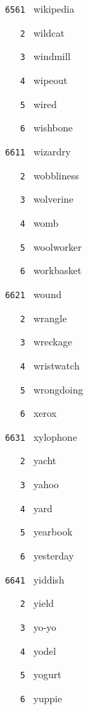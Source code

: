\documentclass[11pt]{article}
\begin{document}
\begin{multicols}{6}
\noindent \texttt{ 6561 } wikipedia  \par
\noindent \texttt{ \ \ \ 2 } wildcat  \par
\noindent \texttt{ \ \ \ 3 } windmill  \par
\noindent \texttt{ \ \ \ 4 } wipeout  \par
\noindent \texttt{ \ \ \ 5 } wired  \par
\noindent \texttt{ \ \ \ 6 } wishbone  \par
\noindent \texttt{ 6611 } wizardry  \par
\noindent \texttt{ \ \ \ 2 } wobbliness  \par
\noindent \texttt{ \ \ \ 3 } wolverine  \par
\noindent \texttt{ \ \ \ 4 } womb  \par
\noindent \texttt{ \ \ \ 5 } woolworker  \par
\noindent \texttt{ \ \ \ 6 } workbasket  \par
\vspace{3mm}
\noindent \texttt{ 6621 } wound  \par
\noindent \texttt{ \ \ \ 2 } wrangle  \par
\noindent \texttt{ \ \ \ 3 } wreckage  \par
\noindent \texttt{ \ \ \ 4 } wristwatch  \par
\noindent \texttt{ \ \ \ 5 } wrongdoing  \par
\noindent \texttt{ \ \ \ 6 } xerox  \par
\vspace{3mm}
\noindent \texttt{ 6631 } xylophone  \par
\noindent \texttt{ \ \ \ 2 } yacht  \par
\noindent \texttt{ \ \ \ 3 } yahoo  \par
\noindent \texttt{ \ \ \ 4 } yard  \par
\noindent \texttt{ \ \ \ 5 } yearbook  \par
\noindent \texttt{ \ \ \ 6 } yesterday  \par
\vspace{3mm}
\noindent \texttt{ 6641 } yiddish  \par
\noindent \texttt{ \ \ \ 2 } yield  \par
\noindent \texttt{ \ \ \ 3 } yo-yo  \par
\noindent \texttt{ \ \ \ 4 } yodel  \par
\noindent \texttt{ \ \ \ 5 } yogurt  \par
\noindent \texttt{ \ \ \ 6 } yuppie  \par

\end{multicols}
\end{document}
